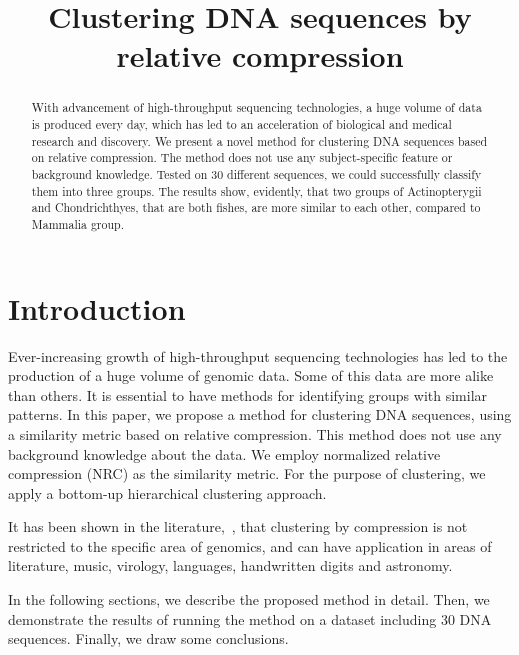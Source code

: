 \documentclass[extendedabs]{recpad2k}
\title{Clustering DNA sequences by relative compression}
\begin{document}
\maketitle

\begin{abstract}
   With advancement of high-throughput sequencing technologies, a huge volume of data is produced every day, which has led to an acceleration of biological and medical research and discovery. We present a novel method for clustering DNA sequences based on relative compression. The method does not use any subject-specific feature or background knowledge. Tested on 30 different sequences, we could successfully classify them into three groups. The results show, evidently, that two groups of Actinopterygii and Chondrichthyes, that are both fishes, are more similar to each other, compared to Mammalia group.
\end{abstract}

\section{Introduction}
Ever-increasing growth of high-throughput sequencing technologies has led to the production of a huge volume of genomic data. Some of this data are more alike than others. It is essential to have methods for identifying groups with similar patterns. In this paper, we propose a method for clustering DNA sequences, using a similarity metric based on relative compression. This method does not use any background knowledge about the data. We employ normalized relative compression (NRC) as the similarity metric. For the purpose of clustering, we apply a bottom-up hierarchical clustering approach.

It has been shown in the literature,~\cite{cilibrasi2005clustering}, that clustering by compression is not restricted to the specific area of genomics, and can have application in areas of literature, music, virology, languages, handwritten digits and astronomy.

In the following sections, we describe the proposed method in detail. Then, we demonstrate the results of running the method on a dataset including 30 DNA sequences. Finally, we draw some conclusions.

\end{document}
